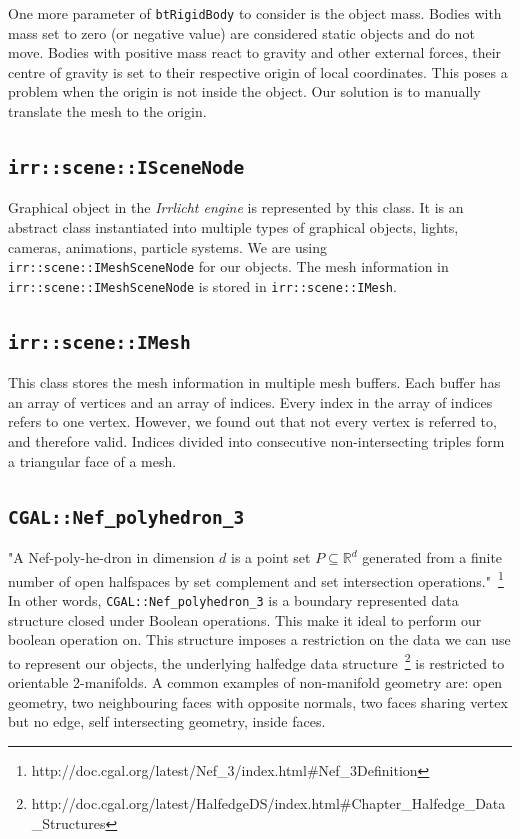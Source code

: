 One more parameter of {\tt btRigidBody} to consider is the object mass. Bodies with mass set to zero (or negative value) are considered static objects and do not move. Bodies with positive mass react to gravity and other external forces, their centre of gravity is set to their respective origin of local coordinates. This poses a problem when the origin is not inside the object. Our solution is to manually translate the mesh to the origin. 

\subsection*{\tt irr::scene::ISceneNode} 
Graphical object in the \emph{Irrlicht engine} is represented by this class. It is an abstract class instantiated into multiple types of graphical objects, \eg lights, cameras, animations, particle systems. We are using {\tt irr::scene::IMeshSceneNode} for our objects. The mesh information in {\tt irr::scene::IMeshSceneNode} is stored in {\tt irr::scene::IMesh}. 

\subsection*{\tt irr::scene::IMesh} 
This class stores the mesh information in multiple mesh buffers. Each buffer has an array of vertices and an array of indices. Every index in the array of indices refers to one vertex. However, we found out that not every vertex is referred to, and therefore valid. Indices divided into consecutive non-intersecting triples form a triangular face of a mesh. 

\subsection*{\tt CGAL::Nef\_polyhedron\_3}
\label{sec:nef}
"A Nef-poly-he-dron in dimension $d$ is a point set $P \subseteq \mathbb{R}^d$ generated from a finite number of open halfspaces by set complement and set intersection operations."~\footnote{http://doc.cgal.org/latest/Nef\_3/index.html\#Nef\_3Definition} In other words, {\tt CGAL::Nef\_polyhedron\_3} is a boundary represented data structure closed under Boolean operations. This make it ideal to perform our boolean operation on.
This structure imposes a restriction on the data we can use to represent our objects, the underlying halfedge data structure~\footnote{http://doc.cgal.org/latest/HalfedgeDS/index.html\#Chapter\_Halfedge\_Data\_Structures} is restricted to orientable 2-manifolds. A common examples of non-manifold geometry are: open geometry, two neighbouring faces with opposite normals, two faces sharing vertex but no edge, self intersecting geometry, inside faces.

